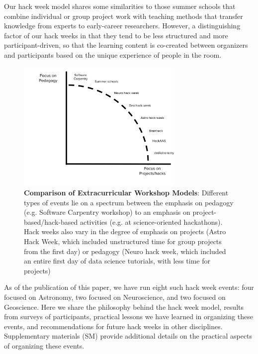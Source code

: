 Our hack week model shares some similarities to those summer schools that combine individual or group project work with teaching methods that transfer knowledge from experts to early-career researchers.
However, a distinguishing factor of our hack weeks in that they tend to be less structured and more participant-driven, so that the learning content is co-created between organizers and participants based on the unique experience of people in the room. 

\begin{figure}
\begin{center}
\includegraphics[width=8cm]{NewHackSpectrum.pdf}
\caption{{\bf Comparison of Extracurricular Workshop Models}: Different types of events lie on a spectrum between the emphasis on pedagogy (e.g. Software Carpentry workshop) to an emphasis on project-based/hack-based activities (e.g. at science-oriented hackathons). Hack weeks also vary in the degree of emphasis on projects (Astro Hack Week, which included unstructured time for group projects from the first day) or pedagogy (Neuro hack week, which included an entire first day of data science tutorials, with less time for projects)}
\label{fig:hackspectrum}
\end{center}
\end{figure}

As of the publication of this paper, we have run eight such hack week events: four focused on Astronomy, two focused on Neuroscience, and two focused on Geoscience.
Here we share the philosophy behind the hack week model, results from surveys of participants, practical lessons we have learned in organizing these events, and recommendations for future hack weeks in other disciplines. Supplementary materials (SM) provide additional details on the practical aspects of organizing these events.
